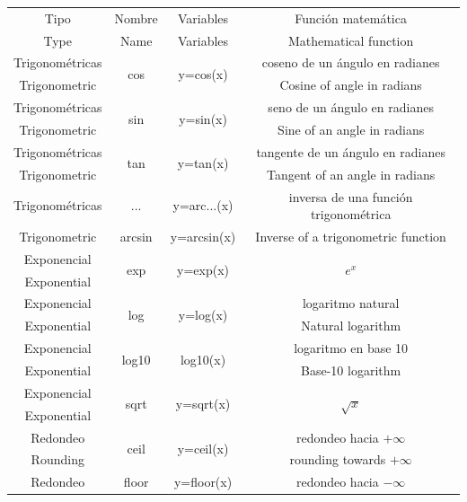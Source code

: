 \begin{table}[H]
 \label{tabfun}

\begin{tabular}{c|c|c|c}
Tipo&Nombre&Variables&Función matemática\\
Type&Name&Variables&Mathematical function\\
\hline
\hline

Trigonométricas&\multirow{2}{*}{cos}&\multirow{2}{4em}{y=cos(x)}&coseno de un ángulo en radianes\\
Trigonometric& & & Cosine of angle in radians\\
\hline
Trigonométricas&\multirow{2}{*}{sin}&\multirow{2}{4em}{y=sin(x)}&seno de un ángulo en radianes\\
Trigonometric& & &Sine of an angle in radians\\
\hline
Trigonométricas&\multirow{2}{*}{tan}&\multirow{2}{4em}{y=tan(x)}&tangente de un ángulo en radianes\\
Trigonometric & & &Tangent of an angle in radians\\
\hline
Trigonométricas &...&y=arc...(x)&inversa de una función trigonométrica\\
Trigonometric &arcsin&y=arcsin(x)& Inverse of a trigonometric function\\
\hline
\hline
Exponencial&\multirow{2}{*}{exp}&\multirow{2}{*}{y=exp(x)}&\multirow{2}{*}{$e^x$}\\
Exponential& & & \\
\hline
Exponencial&\multirow{2}{*}{log}&\multirow{2}{*}{y=log(x)}&logaritmo natural\\
Exponential & & & Natural logarithm\\
\hline
Exponencial&\multirow{2}{*}{log10}&\multirow{2}{*}{log10(x)}&logaritmo en base 10\\
Exponential& & & Base-10 logarithm\\
\hline
Exponencial&\multirow{2}{*}{sqrt}&\multirow{2}{*}{y=sqrt(x)}&\multirow{2}{*}{$\sqrt{x}$}\\
Exponential& & & \\
\hline
\hline
Redondeo&\multirow{2}{*}{ceil}&\multirow{2}{*}{y=ceil(x)}& redondeo hacia $+\infty$\\
Rounding& & & rounding towards $+\infty$\\
\hline
Redondeo&\multirow{2}{*}{floor}&\multirow{2}{*}{y=floor(x)}&redondeo hacia $-\infty$\\

\end{tabular}
\end{table}

